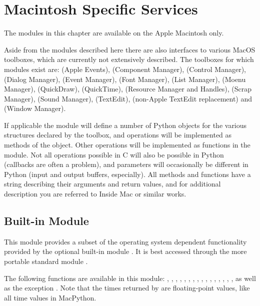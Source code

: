 \chapter{Macintosh Specific Services}

The modules in this chapter are available on the Apple Macintosh only.

Aside from the modules described here there are also interfaces to
various MacOS toolboxes, which are currently not extensively
described. The toolboxes for which modules exist are:
 (Apple Events),
 (Component Manager),
 (Control Manager),
 (Dialog Manager),
 (Event Manager),
 (Font Manager),
 (List Manager),
 (Moenu Manager),
 (QuickDraw),
 (QuickTime),
 (Resource Manager and Handles),
 (Scrap Manager),
 (Sound Manager),
 (TextEdit),
 (non-Apple TextEdit replacement) and
 (Window Manager).

If applicable the module will define a number of Python objects for
the various structures declared by the toolbox, and operations will be
implemented as methods of the object. Other operations will be
implemented as functions in the module. Not all operations possible in
C will also be possible in Python (callbacks are often a problem), and
parameters will occasionally be different in Python (input and output
buffers, especially). All methods and functions have a 
string describing their arguments and return values, and for
additional description you are referred to Inside Mac or similar
works.

\section{Built-in Module }

This module provides a subset of the operating system dependent
functionality provided by the optional built-in module .
It is best accessed through the more portable standard module
.

The following functions are available in this module:
,
,
,
,
,
,
,
,
,
,
,
,
,
,
,
,
as well as the exception . Note that the times returned by
 are floating-point values, like all time values in
MacPython.


